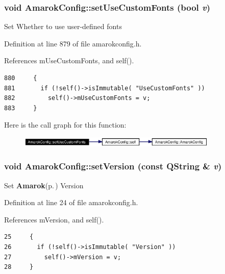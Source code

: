 \subsubsection{\setlength{\rightskip}{0pt plus 5cm}void Amarok\-Config::set\-Use\-Custom\-Fonts (bool {\em v})\hspace{0.3cm}{\tt  [inline, static]}}\label{classAmarokConfig_AmarokConfige91}


Set Whether to use user-defined fonts 

Definition at line 879 of file amarokconfig.h.

References m\-Use\-Custom\-Fonts, and self().



\footnotesize\begin{verbatim}880     {
881       if (!self()->isImmutable( "UseCustomFonts" ))
882         self()->mUseCustomFonts = v;
883     }
\end{verbatim}\normalsize 


Here is the call graph for this function:\begin{figure}[H]
\begin{center}
\leavevmode
\includegraphics[width=269pt]{classAmarokConfig_AmarokConfige91_cgraph}
\end{center}
\end{figure}
\subsubsection{\setlength{\rightskip}{0pt plus 5cm}void Amarok\-Config::set\-Version (const QString \& {\em v})\hspace{0.3cm}{\tt  [inline, static]}}\label{classAmarokConfig_AmarokConfige1}


Set {\bf Amarok}{\rm (p.\,\pageref{namespaceAmarok})} Version 

Definition at line 24 of file amarokconfig.h.

References m\-Version, and self().



\footnotesize\begin{verbatim}25     {
26       if (!self()->isImmutable( "Version" ))
27         self()->mVersion = v;
28     }
\end{verbatim}\normalsize 


